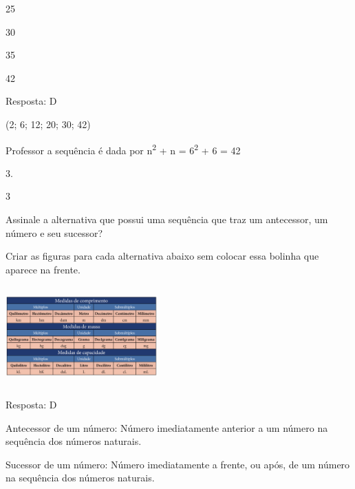 \begin{escolha}

\item
  25
\item
  30
\item
  35
\item
  42
\end{escolha}

Resposta: D

(2; 6; 12; 20; 30; 42)

Professor a sequência é dada por n\textsuperscript{2} + n =
6\textsuperscript{2} + 6 = 42

3.

\num{3}

Assinale a alternativa que possui uma sequência que traz um antecessor,
um número e seu sucessor?

Criar as figuras para cada alternativa abaixo sem colocar essa bolinha
que aparece na frente.

\includegraphics[width=2.30020in,height=1.50013in]{media/image38.png}

Resposta: D

Antecessor de um número: Número imediatamente anterior a um número na
sequência dos números naturais.

Sucessor de um número: Número imediatamente a frente, ou após, de um
número na sequência dos números naturais.

\chapter{}



